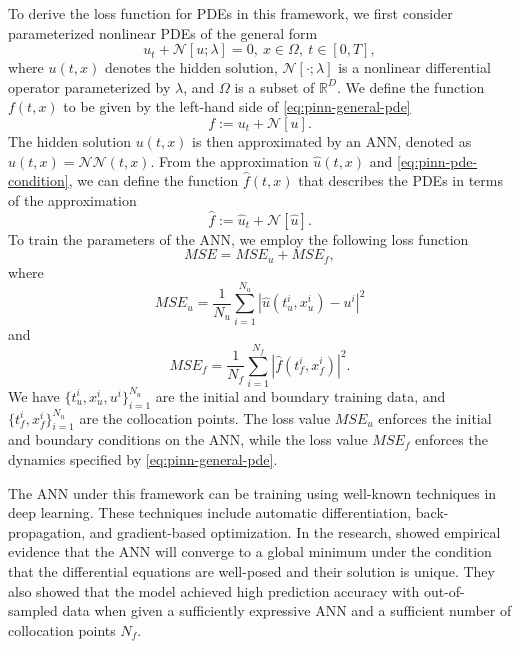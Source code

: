 To derive the loss function for \glspl{PDE} in this framework, we first consider parameterized nonlinear \glspl{PDE} of the general form \cite{raissiPhysicsinformedNeuralNetworks2019}
\begin{equation}
    u_t + \mathcal{N}[u; \lambda] = 0,\ x \in \Omega,\ t \in [0, T],
    \label{eq:pinn-general-pde}
\end{equation}
where $u(t, x)$ denotes the hidden solution, $\mathcal{N}[\cdot; \lambda]$ is a nonlinear differential operator parameterized by $\lambda$, and $\Omega$ is a subset of $\mathbb{R}^D$.
We define the function $f(t, x)$ to be given by the left-hand side of \autoref{eq:pinn-general-pde}
\begin{equation}
    f := u_t + \mathcal{N}[u].
    \label{eq:pinn-pde-condition}
\end{equation}
The hidden solution $u(t, x)$ is then approximated by an \gls{ANN}, denoted as $\hat{u}(t, x) = \mathcal{NN}(t, x)$.
From the approximation $\hat{u}(t, x)$ and \autoref{eq:pinn-pde-condition}, we can define the function $\hat{f}(t, x)$ that describes the \glspl{PDE} in terms of the approximation
\begin{equation*}
    \hat{f} := \hat{u}_t + \mathcal{N}[\hat{u}].
\end{equation*}
To train the parameters of the \gls{ANN}, we employ the following loss function \cite{raissiPhysicsinformedNeuralNetworks2019}
\begin{equation*}
    MSE = MSE_u + MSE_f,
\end{equation*}
where
\begin{equation*}
    MSE_u = \frac{1}{N_u} \sum_{i=1}^{N_u} |\hat{u}(t_u^i, x_u^i) - u^i|^2
\end{equation*}
and
\begin{equation*}
    MSE_f = \frac{1}{N_f} \sum_{i=1}^{N_f} |\hat{f}(t_f^i, x_f^i)|^2.
\end{equation*}
We have $\{t_u^i, x_u^i, u^i\}_{i=1}^{N_u}$ are the initial and boundary training data, and $\{t_f^i, x_f^i\}_{i=1}^{N_u}$ are the collocation points.
The loss value $MSE_u$ enforces the initial and boundary conditions on the \gls{ANN}, while the loss value $MSE_f$ enforces the dynamics specified by \autoref{eq:pinn-general-pde}.

The \gls{ANN} under this framework can be training using well-known techniques in deep learning.
These techniques include automatic differentiation, back-propagation, and gradient-based optimization.
In the research, \citeauthor{raissiPhysicsinformedNeuralNetworks2019} \cite{raissiPhysicsinformedNeuralNetworks2019} showed empirical evidence that the \gls{ANN} will converge to a global minimum under the condition that the differential equations are well-posed and their solution is unique.
They also showed that the model achieved high prediction accuracy with out-of-sampled data when given a sufficiently expressive \gls{ANN} and a sufficient number of collocation points $N_f$.